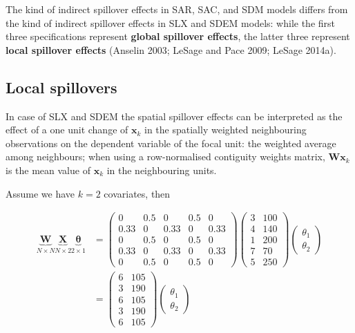 \documentclass[
  letterpaper,
  DIV=11,
  numbers=noendperiod]{scrreprt}
\begin{document}
The kind of indirect spillover effects in SAR, SAC, and SDM models
differs from the kind of indirect spillover effects in SLX and SDEM
models: while the first three specifications represent \textbf{global
spillover effects}, the latter three represent \textbf{local spillover
effects} (Anselin 2003; LeSage and Pace 2009; LeSage 2014a).

\hypertarget{local-spillovers}{%
\subsection{Local spillovers}\label{local-spillovers}}

In case of SLX and SDEM the spatial spillover effects can be interpreted
as the effect of a one unit change of \({\boldsymbol{\mathbf{x}}}_k\) in
the spatially weighted neighbouring observations on the dependent
variable of the focal unit: the weighted average among neighbours; when
using a row-normalised contiguity weights matrix,
\({\boldsymbol{\mathbf{W}}} {\boldsymbol{\mathbf{x}}}_k\) is the mean
value of \({\boldsymbol{\mathbf{x}}}_k\) in the neighbouring units.

Assume we have \(k =2\) covariates, then

\[
\begin{split}
\underbrace{\boldsymbol{\mathbf{W}}}_{N \times N}  \underbrace{\boldsymbol{\mathbf{X}}}_{N \times 2} \underbrace{\boldsymbol{\mathbf{\theta}}}_{2 \times 1} & = 
\begin{pmatrix}
      0 & 0.5 & 0 & 0.5 & 0 \\
      0.33 & 0 & 0.33 & 0 & 0.33 \\
      0 & 0.5 & 0 & 0.5 & 0 \\
      0.33 & 0 & 0.33 & 0 & 0.33 \\
      0 & 0.5 & 0 & 0.5 & 0
  \end{pmatrix}
  \begin{pmatrix}
      3 & 100 \\
      4 & 140 \\
      1 & 200 \\
      7 & 70  \\
      5 & 250 
  \end{pmatrix}
    \begin{pmatrix}
      \theta_1 \\
      \theta_2 
  \end{pmatrix}\\
 & =   
 \begin{pmatrix}
      6 & 105 \\
      3 & 190 \\
      6 & 105 \\
      3 & 190  \\
      6 & 105 
  \end{pmatrix}
 \begin{pmatrix}
      \theta_1 \\
      \theta_2
  \end{pmatrix}\\
\end{split} 
\]
\end{document}
